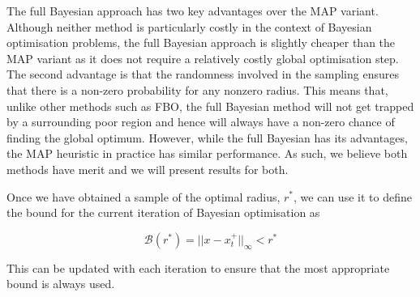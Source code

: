 \documentclass[preprint]{elsarticle}
\begin{document}
The full Bayesian approach has two key advantages over the MAP variant. Although neither method is particularly costly in the context of Bayesian optimisation problems, the full Bayesian approach is slightly cheaper than the MAP variant as it does not require a relatively costly global optimisation step. The second advantage is that the randomness involved in the sampling ensures that there is a non-zero probability for any nonzero radius. This means that, unlike other methods such as FBO, the full Bayesian method will not get trapped by a surrounding poor region and hence will always have a non-zero chance of finding the global optimum. However, while the full Bayesian has its advantages, the MAP heuristic in practice has similar performance. As such, we believe both methods have merit and we will present results for both.

Once we have obtained a sample of the optimal radius, $r^*$, we can use it to define the bound for the current iteration of Bayesian optimisation as 
\begin{linenomath*}
\begin{equation}
\mathcal{B}(r^*)=||x-x_t^+||_\infty<r^*
\end{equation}
\end{linenomath*}
This can be updated with each iteration to ensure that the most appropriate bound is always used.
\end{document}
